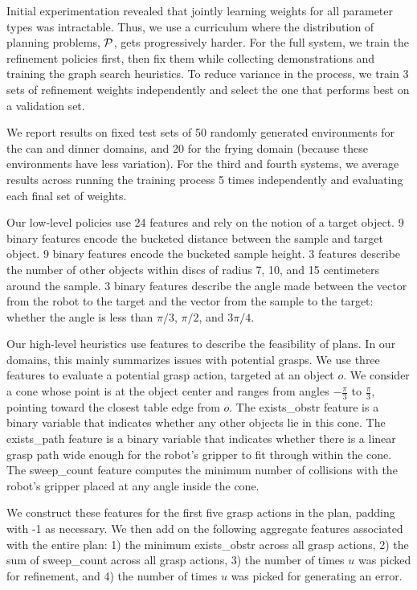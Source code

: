 Initial experimentation revealed that jointly learning weights for all
parameter types was intractable. Thus, we use a curriculum where the
distribution of planning problems, $\mathcal{P}$, gets progressively
harder. For the full system, we train the refinement policies first,
then fix them while collecting demonstrations and training the graph
search heuristics. To reduce variance in the process, we train 3 sets
of refinement weights independently and select the one that performs
best on a validation set.

We report results on fixed test sets of 50 randomly generated
environments for the can and dinner domains, and 20 for the frying
domain (because these environments have less variation).  For the
third and fourth systems, we average results across running the
training process 5 times independently and evaluating each final set
of weights.

Our low-level policies use 24 features and rely on the notion of a
target object. 9 binary features encode the bucketed distance between
the sample and target object. 9 binary features encode the bucketed
sample height. 3 features describe the number of other objects within
discs of radius 7, 10, and 15 centimeters around the sample. 3 binary
features describe the angle made between the vector from the robot to
the target and the vector from the sample to the target: whether the
angle is less than $\pi/3$, $\pi/2$, and $3\pi/4$.

Our high-level heuristics use features to describe the feasibility of
plans. In our domains, this mainly summarizes issues with potential
grasps. We use three features to evaluate a potential grasp action,
targeted at an object $o$. We consider a cone whose point is at the
object center and ranges from angles $-\frac{\pi}{3}$ to
$\frac{\pi}{3}$, pointing toward the closest table edge from $o$. The
exists\_obstr feature is a binary variable that indicates whether any
other objects lie in this cone. The exists\_path feature is a binary
variable that indicates whether there is a linear grasp path wide
enough for the robot's gripper to fit through within the cone. The
sweep\_count feature computes the minimum number of collisions with the robot's
gripper placed at any angle inside the cone.

We construct these features for the first five grasp actions in the
plan, padding with -1 as necessary. We then add on the following
aggregate features associated with the entire plan: 1) the minimum
exists\_obstr across all grasp actions, 2) the sum of sweep\_count
across all grasp actions, 3) the number of times $u$ was picked for
refinement, and 4) the number of times $u$ was picked for generating
an error.

